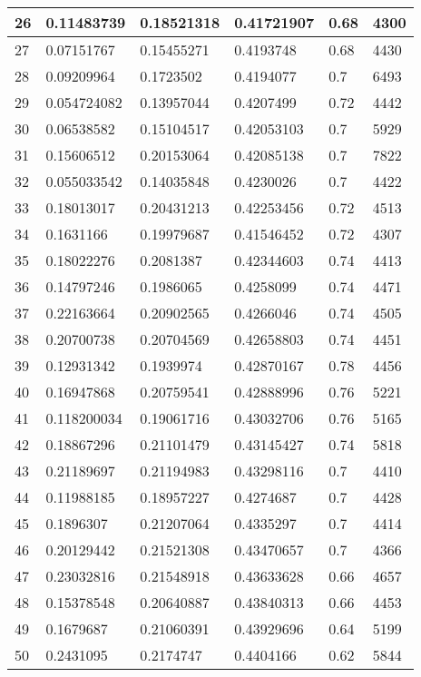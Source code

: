 \begin{longtable}{|l|l|l|l|l|l|}
26 & 0.11483739 & 0.18521318 & 0.41721907 & 0.68 & 4300 \\ \hline 
27 & 0.07151767 & 0.15455271 & 0.4193748 & 0.68 & 4430 \\ \hline 
28 & 0.09209964 & 0.1723502 & 0.4194077 & 0.7 & 6493 \\ \hline 
29 & 0.054724082 & 0.13957044 & 0.4207499 & 0.72 & 4442 \\ \hline 
30 & 0.06538582 & 0.15104517 & 0.42053103 & 0.7 & 5929 \\ \hline 
31 & 0.15606512 & 0.20153064 & 0.42085138 & 0.7 & 7822 \\ \hline 
32 & 0.055033542 & 0.14035848 & 0.4230026 & 0.7 & 4422 \\ \hline 
33 & 0.18013017 & 0.20431213 & 0.42253456 & 0.72 & 4513 \\ \hline 
34 & 0.1631166 & 0.19979687 & 0.41546452 & 0.72 & 4307 \\ \hline 
35 & 0.18022276 & 0.2081387 & 0.42344603 & 0.74 & 4413 \\ \hline 
36 & 0.14797246 & 0.1986065 & 0.4258099 & 0.74 & 4471 \\ \hline 
37 & 0.22163664 & 0.20902565 & 0.4266046 & 0.74 & 4505 \\ \hline 
38 & 0.20700738 & 0.20704569 & 0.42658803 & 0.74 & 4451 \\ \hline 
39 & 0.12931342 & 0.1939974 & 0.42870167 & 0.78 & 4456 \\ \hline 
40 & 0.16947868 & 0.20759541 & 0.42888996 & 0.76 & 5221 \\ \hline 
41 & 0.118200034 & 0.19061716 & 0.43032706 & 0.76 & 5165 \\ \hline 
42 & 0.18867296 & 0.21101479 & 0.43145427 & 0.74 & 5818 \\ \hline 
43 & 0.21189697 & 0.21194983 & 0.43298116 & 0.7 & 4410 \\ \hline 
44 & 0.11988185 & 0.18957227 & 0.4274687 & 0.7 & 4428 \\ \hline 
45 & 0.1896307 & 0.21207064 & 0.4335297 & 0.7 & 4414 \\ \hline 
46 & 0.20129442 & 0.21521308 & 0.43470657 & 0.7 & 4366 \\ \hline 
47 & 0.23032816 & 0.21548918 & 0.43633628 & 0.66 & 4657 \\ \hline 
48 & 0.15378548 & 0.20640887 & 0.43840313 & 0.66 & 4453 \\ \hline 
49 & 0.1679687 & 0.21060391 & 0.43929696 & 0.64 & 5199 \\ \hline 
50 & 0.2431095 & 0.2174747 & 0.4404166 & 0.62 & 5844 \\ \hline 
\end{longtable}